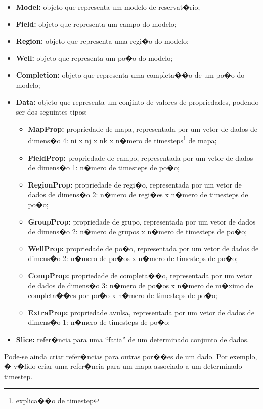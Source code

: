 \documentclass[dissertacao,modelo1,brazil]{ThesisPUC}
\begin{document}
\begin{itemize}
  \item \textbf{Model:} 
  objeto que representa um modelo de reservat�rio;
  \item \textbf{Field:} 
  objeto que representa um campo do modelo;
  \item \textbf{Region:} 
  objeto que representa uma regi�o do modelo;
  \item \textbf{Well:} 
  objeto que representa um po�o do modelo;
  \item \textbf{Completion:} 
  objeto que representa uma completa��o de um po�o do modelo;
  \item \textbf{Data:}
  objeto que representa um conjinto de valores de propriedades, podendo ser
  dos seguintes tipos:
  \begin{itemize}
    \item \textbf{MapProp:}
    propriedade de mapa, representada por um vetor de 
    dados de dimens�o 4: ni x nj x nk x n�mero de timesteps\footnote{explica��o de timestep} de mapa; 
    \item \textbf{FieldProp:}
    propriedade de campo, representada por um vetor de 
    dados de dimens�o 1: n�mero de timesteps de po�o; 
    \item \textbf{RegionProp:}
    propriedade de regi�o, representada por um vetor de 
    dados de dimens�o 2: n�mero de regi�es x n�mero de timesteps de 
    po�o;  
    \item \textbf{GroupProp:}
    propriedade de grupo, representada por um vetor de 
    dados de dimens�o 2: n�mero de grupos x n�mero de timesteps de 
    po�o;  
    \item \textbf{WellProp:}
    propriedade de po�o, representada por um vetor de 
    dados de dimens�o 2: n�mero de po�os x n�mero de timesteps de 
    po�o; 
    \item \textbf{CompProp:}
    propriedade de completa��o, representada por um 
    vetor de dados de dimens�o 3: n�mero de po�os x n�mero de 
    m�ximo de completa��es por po�o x n�mero de timesteps de po�o;
    \item \textbf{ExtraProp:}
    propriedade avulsa, representada por um vetor de 
    dados de dimens�o 1: n�mero de timesteps de po�o;
  \end{itemize}
  \item \textbf{Slice:}
  refer�ncia para uma ``fatia'' de um determinado conjunto de dados.
\end{itemize}

Pode-se ainda criar refer�ncias para outras por��es de um dado. Por exemplo, � 
v�lido criar uma refer�ncia para um mapa associado a um determinado timestep.
\end{document}
